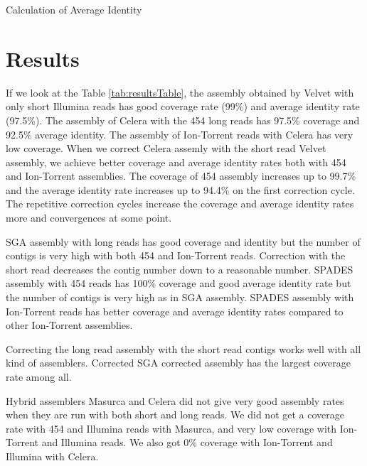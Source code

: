 \documentclass[12pt]{article}
\begin{document}
\begin{algorithm}
\caption{Calculation of Average Identity}
\label{avgIdentity}
\begin{algorithmic} 
\ENDWHILE
{}
\end{algorithmic}
\end{algorithm}

\section{Results}
\label{res}
If we look at the Table \ref{tab:resultsTable}, the assembly obtained by Velvet with only short Illumina reads  has good coverage rate (99\%) and average identity rate (97.5\%). The assembly of Celera with the 454 long reads has 97.5\% coverage and 92.5\% average identity. The assembly of Ion-Torrent reads with Celera has very low coverage. When we correct Celera assemly with the short read Velvet assembly, we achieve better coverage and average identity rates both with 454 and Ion-Torrent assemblies. The coverage of 454 assembly increases up to 99.7\% and the average identity rate increases up to 94.4\% on the first correction cycle. The repetitive correction cycles increase the coverage and average identity rates more and convergences at some point.

SGA assembly with long reads has good coverage and identity but the number of contigs is very high with both 454 and Ion-Torrent reads. Correction with the short read decreases the contig number down to a reasonable number.
SPADES assembly with 454 reads has 100\% coverage and good average identity rate but the number of contigs is very high as in SGA assembly. SPADES assembly with Ion-Torrent reads has better coverage and average identity rates compared to other Ion-Torrent assemblies.

Correcting the long read assembly with the short read contigs works well with all kind of assemblers. Corrected SGA corrected assembly has the largest coverage rate among all.

Hybrid assemblers Masurca and Celera did not give very good assembly rates when they are run with both short and long reads. We did not get a coverage rate with 454 and Illumina reads with Masurca, and very low coverage with Ion-Torrent and Illumina reads. We also got 0\% coverage with Ion-Torrent and Illumina with Celera.
\end{document}
